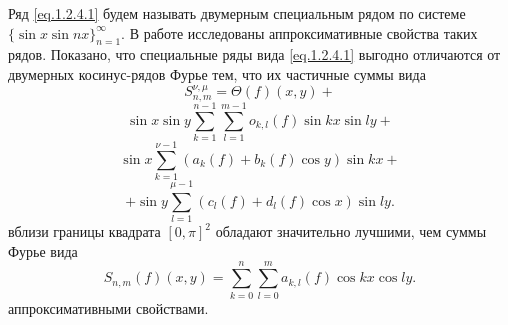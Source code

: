 Ряд \eqref{eq.1.2.4.1} будем называть двумерным специальным рядом по системе $\{\sin x\sin nx\}_{n=1}^\infty$. В работе \cite{shii-sinkx2D} исследованы аппроксимативные свойства таких рядов. Показано, что специальные ряды вида \eqref{eq.1.2.4.1} выгодно отличаются от двумерных косинус-рядов Фурье тем, что их частичные суммы вида
$$
S_{n,m}^{\nu,\mu}= \Theta(f)(x,y)+
$$
$$
 \sin x\sin y\sum_{k=1}^{n-1}\sum_{l=1}^{m-1} o_{k,l}(f)\sin kx\sin ly+
$$
$$
\sin x\sum_{k=1}^{\nu-1} (a_{k}(f)+b_{k}(f)\cos y)\sin kx+
$$
$$
 +\sin y\sum_{l=1}^{\mu-1} (c_{l}(f)+ d_{l}(f)\cos x)\sin ly.%
$$
вблизи границы квадрата $[0,\pi]^2$ обладают значительно лучшими, чем суммы Фурье вида
$$
S_{n,m}(f)(x,y)=\sum_{k=0}^n\sum_{l=0}^ma_{k,l}(f)\cos kx\cos ly.
$$
 аппроксимативными свойствами.

